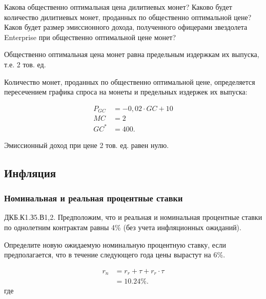 \documentclass[12pt, table, a4paper,twoside]{exam}
\begin{document}
\begin{questions}
\begin{subparts}
\begin{solution}[12em]
	\end{solution}
	
	\subpart[10] Какова общественно оптимальная цена дилитиевых монет? Каково будет количество дилитиевых монет, проданных по общественно оптимальной цене? Каков будет размер эмиссионного дохода, полученного офицерами звездолета Enterprise при общественно оптимальной цене монет?
	
	\begin{solution}[12em]
		
	Общественно оптимальная цена монет равна предельным издержкам их выпуска, т.е. 2 тов. ед.
	
	Количество монет, проданных по общественно оптимальной цене, определяется пересечением графика спроса на монеты и предельных издержек их выпуска:
	
	\begin{align*}
		P_{GC} &= -0,02 \cdot GC + 10\\
		MC &= 2\\
		GC^* &= 400. 
	\end{align*}
	
	Эмиссионный доход при цене 2 тов. ед. равен нулю.
		
	\end{solution}
	
\end{subparts}
\addpoints

\subsection{Инфляция}
\subsubsection{Номинальная и реальная процентные ставки}
\question[10] ДКБ.К1.З5.В1,2. Предположим, что и реальная и номинальная процентные ставки по однолетним контрактам равны 4\% (без учета инфляционных ожиданий).
\noaddpoints

\begin{subparts}
	\subpart[5] Определите новую ожидаемую номинальную процентную ставку, если предполагается, что в течение следующего года цены вырастут на 6\%.

	\begin{solution}[12em]
	\begin{align}
	r_n&=r_r+\tau + r_r \cdot \tau\\
	&=10.24\%.\nonumber
	\end{align}
	где
	

\end{solution}
\end{subparts}
\end{questions}
\end{document}
